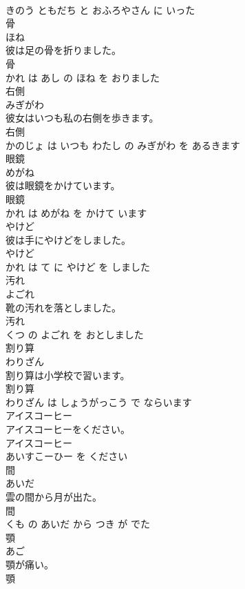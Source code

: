 \documentclass[8pt]{extreport}
\begin{document}
\begin{CJK}{UTF8}{min}
\\	きのう ともだち と おふろやさん に いった			
\\	骨	
\\	ほね			
\\	彼は足の骨を折りました。	
\\	骨 
\\	かれ は あし の ほね を おりました			
\\	右側	
\\	みぎがわ			
\\	彼女はいつも私の右側を歩きます。	
\\	右側 
\\	かのじょ は いつも わたし の みぎがわ を あるきます			
\\	眼鏡	
\\	めがね			
\\	彼は眼鏡をかけています。	
\\	眼鏡 
\\	かれ は めがね を かけて います			
\\	やけど	
\\	彼は手にやけどをしました。	
\\	やけど 
\\	かれ は て に やけど を しました			
\\	汚れ	
\\	よごれ			
\\	靴の汚れを落としました。	
\\	汚れ 
\\	くつ の よごれ を おとしました			
\\	割り算	
\\	わりざん			
\\	割り算は小学校で習います。	
\\	割り算 
\\	わりざん は しょうがっこう で ならいます			
\\	アイスコーヒー	
\\	アイスコーヒーをください。	
\\	アイスコーヒー 
\\	あいすこーひー を ください			
\\	間	
\\	あいだ			
\\	雲の間から月が出た。	
\\	間 
\\	くも の あいだ から つき が でた			
\\	顎	
\\	あご			
\\	顎が痛い。	
\\	顎 

\end{CJK}
\end{document}
